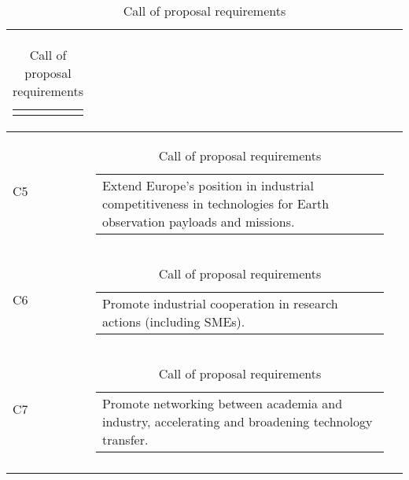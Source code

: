 \begin{longtable}[H]{l c c}
\begin{tabular}[c]{@{}l@{}}
\begin{minipage}[t]{\linewidth}
	\end{minipage} \end{tabular}                                                                                                                                           \\  \midrule
	C5 & \begin{tabular}[c]{@{}l@{}}\begin{minipage}[t]{\linewidth}
Extend Europe's position in industrial competitiveness in technologies for Earth observation payloads and missions. \vspace{0.3cm}
	\end{minipage} \end{tabular}                                                                                                                                             \\  \midrule
	C6 & \begin{tabular}[c]{@{}l@{}}\begin{minipage}[t]{\linewidth}
			Promote industrial cooperation in research actions (including SMEs). \vspace{0.3cm}
	\end{minipage} \end{tabular}                                                                                                                                          \\  \midrule
	C7 & \begin{tabular}[c]{@{}l@{}}\begin{minipage}[t]{\linewidth}
			Promote networking between academia and industry, accelerating and broadening technology transfer. \vspace{0.3cm}
	\end{minipage} \end{tabular}                                                                                                                                             \\                                                                   	\bottomrule[2pt]
	\caption{Call of proposal requirements}
\end{longtable}

